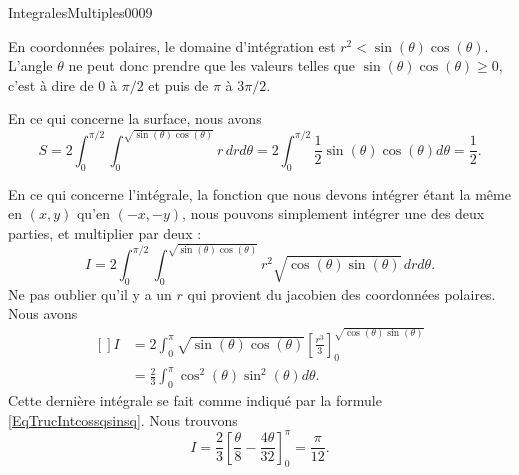 \begin{corrige}{IntegralesMultiples0009}

	En coordonnées polaires, le domaine d'intégration est $r^2<\sin(\theta)\cos(\theta)$. L'angle $\theta$ ne peut donc prendre que les valeurs telles que $\sin(\theta)\cos(\theta)\geq 0$, c'est à dire de $0$ à $\pi/2$ et puis de $\pi$ à $3\pi/2$.

    En ce qui concerne la surface, nous avons
    \begin{equation}
        S=2\int_0^{\pi/2}\int_0^{\sqrt{\sin(\theta)\cos(\theta)}}r\,drd\theta=2\int_0^{\pi/2}\frac{ 1 }{2}\sin(\theta)\cos(\theta)d\theta=\frac{ 1 }{2}.
    \end{equation}
    
	En ce qui concerne l'intégrale, la fonction que nous devons intégrer étant la même en $(x,y)$ qu'en $(-x,-y)$, nous pouvons simplement intégrer une des deux parties, et multiplier par deux :
	\begin{equation}
        I=2\int_0^{\pi/2}\int_0^{\sqrt{\sin(\theta)\cos(\theta)}}r^2\sqrt{\cos(\theta)\sin(\theta)}\,drd\theta.
	\end{equation}
    Ne pas oublier qu'il y a un $r$ qui provient du jacobien des coordonnées polaires. Nous avons
    \begin{equation}
        \begin{aligned}[]
            I&=2\int_0^{\pi}\sqrt{\sin(\theta)\cos(\theta)}\left[ \frac{ r^3 }{ 3 } \right]_0^{\sqrt{\cos(\theta)\sin(\theta)}}\\
            &=\frac{ 2 }{ 3 }\int_0^{\pi}\cos^2(\theta)\sin^2(\theta)d\theta.
        \end{aligned}
    \end{equation}
    Cette dernière intégrale se fait comme indiqué par la formule \eqref{EqTrucIntcossqsinsq}. Nous trouvons
    \begin{equation}
        I=\frac{ 2 }{ 3 }\left[ \frac{ \theta }{ 8 }-\frac{ 4\theta }{ 32 } \right]_0^{\pi}=\frac{ \pi }{ 12 }.
    \end{equation}

\end{corrige}
